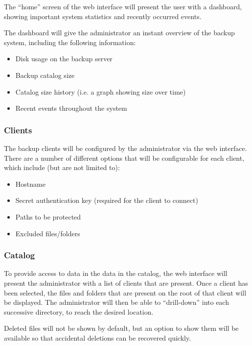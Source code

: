 The ``home'' screen of the web interface will present the user with
a dashboard, showing important system statistics and recently occurred events.

The dashboard will give the administrator an instant overview of the backup
system, including the following information:

\begin{itemize}
    \item Disk usage on the backup server
    \item Backup catalog size
    \item Catalog size history (i.e. a graph showing size over time)
    \item Recent events throughout the system
\end{itemize}

\subsubsection{Clients}

The backup clients will be configured by the administrator via the web
interface. There are a number of different options that will be configurable
for each client, which include (but are not limited to):

\begin{itemize}
    \item Hostname
    \item Secret authentication key (required for the client to connect)
    \item Paths to be protected
    \item Excluded files/folders
\end{itemize}

\subsubsection{Catalog}

To provide access to data in the data in the catalog, the web interface will
present the administrator with a list of clients that are present. Once
a client has been selected, the files and folders that are present on the root
of that client will be displayed. The administrator will then be able to
``drill-down'' into each successive directory, to reach the desired location.

Deleted files will not be shown by default, but an option to show them will be
available so that accidental deletions can be recovered quickly.

